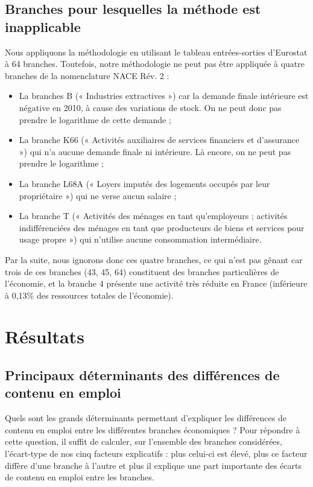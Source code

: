 \subsection{Branches pour lesquelles la méthode est inapplicable}
Nous appliquons la méthodologie en utilisant le tableau entrées-sorties d’Eurostat à 64 branches. Toutefois, notre méthodologie ne peut pas être appliquée à quatre branches de la nomenclature NACE Rév. 2 :
\begin{itemize}
	\item La branches B (« Industries extractives ») car la demande finale intérieure est négative en 2010, à cause des variations de stock. On ne peut donc pas prendre le logarithme de cette demande ;
	\item La branche K66 (« Activités auxiliaires de services financiers et d'assurance ») qui n’a aucune demande finale ni intérieure. Là encore, on ne peut pas prendre le logarithme ;
	\item La branche L68A (« Loyers imputés des logements occupés par leur propriétaire ») qui ne verse aucun salaire ;
	\item La branche T (« Activités des ménages en tant qu'employeurs ; activités indifférenciées des ménages en tant que producteurs de biens et services pour usage propre ») qui n’utilise aucune consommation intermédiaire. 
\end{itemize}

Par la suite, nous ignorons donc ces quatre branches, ce qui n’est pas gênant car trois de ces branches (43, 45, 64) constituent des branches particulières de l’économie, et la branche 4 présente une activité très réduite en France (inférieure à 0,13\% des ressources totales de l’économie).


\section{Résultats}
\label{sec:resultats}

\subsection{Principaux déterminants des différences de contenu en emploi}
Quels sont les grands déterminants permettant d’expliquer les différences de contenu en emploi entre les différentes branches économiques ? Pour répondre à cette question, il suffit de calculer, sur l’ensemble des branches considérées, l’écart-type de nos cinq facteurs explicatifs : plus celui-ci est élevé, plus ce facteur diffère d’une branche à l’autre et plus il explique une part importante des écarts de contenu en emploi entre les branches.

